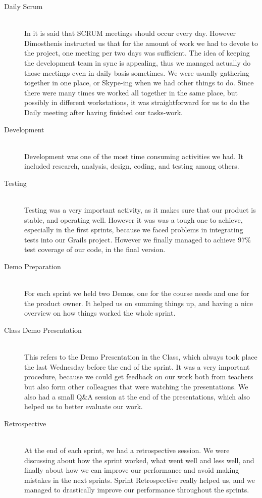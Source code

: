 \begin{description}
  \item[Daily Scrum] \hfill \\
  In \cite{SchwaberScrumGuide} it is said that SCRUM meetings should occur every day. However Dimosthenis instructed us that for the amount of work we had to devote to the project, one meeting per two days was sufficient. The idea of keeping the development team in sync is appealing, thus we managed actually do those meetings even in daily basis sometimes. We were usually gathering together in one place, or Skype-ing when we had other things to do. Since there were many times we worked all together in the same place, but possibly in different workstations, it was straightforward for us to do the Daily meeting after having finished our tasks-work.
  
  \item[Development] \hfill \\
  Development was one of the most time consuming activities we had. It included research, analysis, design, coding, and testing among others.
  \item[Testing] \hfill \\
  Testing was a very important activity, as it makes sure that our product is stable, and operating well. However it was was a tough one to achieve, especially in the first sprints, because we faced problems in integrating tests into our Grails project. However we finally managed to achieve 97\% test coverage of our code, in the final version.  
  \item[Demo Preparation] \hfill \\
  For each sprint we held two Demos, one for the course needs and one for the product owner. It helped us on summing things up, and having a nice overview on how things worked the whole sprint.
  \item[Class Demo Presentation] \hfill \\
  This refers to the Demo Presentation in the Class, which always took place the last Wednesday before the end of the sprint. It was a very important procedure, because we could get feedback on our work both from teachers but also form other colleagues that were watching the presentations. We also  had a small Q\&A session at the end of the presentations, which also helped us to better evaluate our work.
  \item[Retrospective] \hfill \\
  At the end of each sprint, we had a retrospective session. We were discussing about how the sprint worked, what went well and less well, and finally about how we can improve our performance and avoid making mistakes in the next sprints. Sprint Retrospective really helped us, and we managed to drastically improve our performance throughout the sprints.
\end{description}

